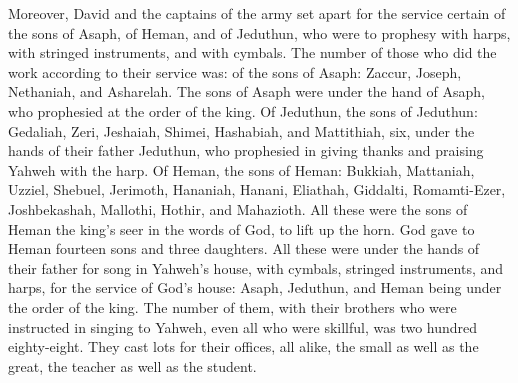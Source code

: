  Moreover, David and the captains of the army set apart for
the service certain of the sons of Asaph, of Heman, and of Jeduthun, who
were to prophesy with harps, with stringed instruments, and with
cymbals. The number of those who did the work according to their service
was:  of the sons of Asaph: Zaccur, Joseph, Nethaniah, and
Asharelah. The sons of Asaph were under the hand of Asaph, who
prophesied at the order of the king.  Of Jeduthun, the sons
of Jeduthun: Gedaliah, Zeri, Jeshaiah, Shimei, Hashabiah, and
Mattithiah, six, under the hands of their father Jeduthun, who
prophesied in giving thanks and praising Yahweh with the harp.
 Of Heman, the sons of Heman: Bukkiah, Mattaniah, Uzziel,
Shebuel, Jerimoth, Hananiah, Hanani, Eliathah, Giddalti, Romamti-Ezer,
Joshbekashah, Mallothi, Hothir, and Mahazioth.  All these
were the sons of Heman the king's seer in the words of God, to lift up
the horn. God gave to Heman fourteen sons and three daughters.
 All these were under the hands of their father for song in
Yahweh's house, with cymbals, stringed instruments, and harps, for the
service of God's house: Asaph, Jeduthun, and Heman being under the order
of the king.  The number of them, with their brothers who
were instructed in singing to Yahweh, even all who were skillful, was
two hundred eighty-eight.  They cast lots for their offices,
all alike, the small as well as the great, the teacher as well as the
student.

